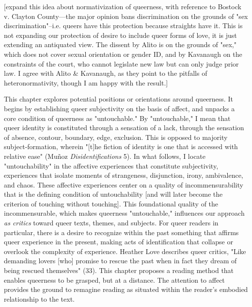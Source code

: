 \documentclass[11pt]{article}
\begin{document}
[expand this idea about normativization of queerness, with reference
to Bostock v. Clayton County---the major opinion bans discrimination
on the grounds of "sex discrimination"--i.e. queers have this
protection because straights have it. This is not expanding our
protection of desire to include queer forms of love, it is just
extending an antiquated view. The dissent by Alito is on the grounds
of "sex," which does not cover sexual orientation or gender ID, and by
Kavanaugh on the constraints of the court, who cannot legislate new
law but can only judge prior law. I agree with Alito \& Kavanaugh, as
they point to the pitfalls of heteronormativity, though I am happy
with the result.]

This chapter explores potential positions or orientations around
queerness. It begins by establishing queer subjectivity on the basis
of affect, and unpacks a core condition of queerness as "untouchable."
By "untouchable," I mean that queer identity is constituted through a
sensation of a lack, through the sensation of absence, contour,
boundary, edge, exclusion. This is opposed to majority
subject-formation, wherein "[t]he fiction of identity is one that is
accessed with relative ease" (Muñoz \emph{Disidentifications} 5). In what
follows, I locate "untouchability" in the affective experiences that
constitute subjectivity, experiences that isolate moments of
strangeness, disjunction, irony, ambivalence, and chaos. These
affective experiences center on a quality of incommensurability that
is the defining condition of untouchability [and will later become the
criterion of touching without touching]. This foundational quality of
the incommensurable, which makes queerness "untouchable," influences
our approach \emph{as critics} toward queer texts, themes, and
subjects. For queer readers in particular, there is a desire to
recognize within the past something that affirms queer experience in
the present, making acts of identification that collapse or overlook
the complexity of experience. Heather Love describes queer critics,
"Like demanding lovers [who] promise to rescue the past when in fact
they dream of being rescued themselves" (33). This chapter proposes a
reading method that enables queerness to be grasped, but at a
distance. The attention to affect provides the ground to remagine
reading as situated within the reader's embodied relationship to the
text.
\end{document}

